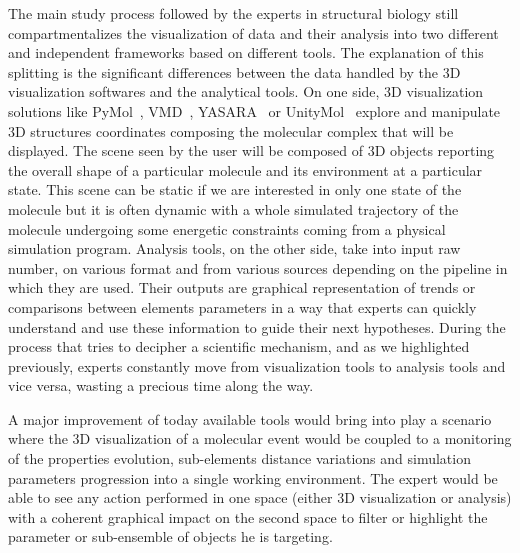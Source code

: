 \documentclass{vgtc}                          %
\begin{document}
The main study process followed by the experts in structural biology still compartmentalizes the visualization of data and their analysis into two different and independent frameworks based on different tools.
The explanation of this splitting is the significant differences between the data handled by the 3D visualization softwares and the analytical tools.
On one side, 3D visualization solutions like PyMol~\cite{delano_pymol_2002}, VMD~\cite{humphrey_vmd:_1996}, YASARA~\cite{krieger2014yasara} or UnityMol~\cite{lv2013game} explore and manipulate 3D structures coordinates composing the molecular complex that will be displayed. The scene seen by the user will be composed of 3D objects reporting the overall shape of a particular molecule and its environment at a particular state. This scene can be static if we are interested in only one state of the molecule but it is often dynamic with a whole simulated trajectory of the molecule undergoing some energetic constraints coming from a physical simulation program.
Analysis tools, on the other side, take into input raw number, on various format and from various sources depending on the pipeline in which they are used. Their outputs are graphical representation of trends or comparisons between elements parameters in a way that experts can quickly understand and use these information to guide their next hypotheses.
During the process that tries to decipher a scientific mechanism, and as we highlighted previously, experts constantly move from visualization tools to analysis tools and vice versa, wasting a precious time along the way.

A major improvement of today available tools would bring into play a scenario where the 3D visualization of a molecular event would be coupled to a monitoring of the properties evolution, sub-elements distance variations and simulation parameters progression into a single working environment. The expert would be able to see any action performed in one space (either 3D visualization or analysis) with a coherent graphical impact on the second space to filter or highlight the parameter or sub-ensemble of objects he is targeting.
\end{document}
